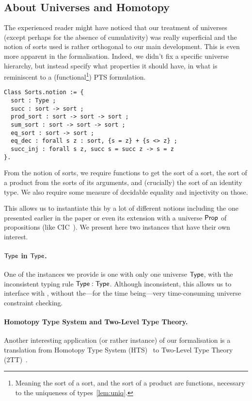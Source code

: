 \subsection{About Universes and Homotopy}
\label{sec:sorts}

The experienced reader might have noticed that our treatment of universes
(except perhaps for the absence of cumulativity) was really superficial and the
notion of sorts used is rather orthogonal to our main development.
This is even more apparent in the formalisation. Indeed, we didn't fix a
specific universe hierarchy, but instead specify what properties it should
have, in what is reminiscent to a (functional\footnote{Meaning the sort of a
sort, and the sort of a product are functions, necessary to the uniqueness of
types~\eqref{lem:uniq}.}) PTS formulation.
%
\begin{verbatim}
Class Sorts.notion := {
  sort : Type ;
  succ : sort -> sort ;
  prod_sort : sort -> sort -> sort ;
  sum_sort : sort -> sort -> sort ;
  eq_sort : sort -> sort ;
  eq_dec : forall s z : sort, {s = z} + {s <> z} ;
  succ_inj : forall s z, succ s = succ z -> s = z
}.
\end{verbatim}
%
From the notion of sorts, we require functions to get the sort of a sort,
the sort of a product from the sorts of its arguments, and (crucially) the sort
of an identity type.
We also require some measure of decidable equality and injectivity on those.

This allows us to instantiate this by a lot of different notions including the
one presented earlier in the paper or even its extension with a universe $\mathsf{Prop}$
of propositions (like CIC~\cite{bertot2004interactive}). We present here two
instances that have their own interest.

\paragraph{$\mathsf{Type}$ in $\mathsf{Type}$.}
One of the instances we provide is one with only one universe $\mathsf{Type}$, with the
inconsistent typing rule $\mathsf{Type} : \mathsf{Type}$.
Although inconsistent, this allows us to interface with \TemplateCoq, without
the---for the time being---very time-consuming universe constraint checking.

\paragraph{Homotopy Type System and Two-Level Type Theory.}
Another interesting application (or rather instance) of our formalisation
is a translation from Homotopy Type System (HTS)~\cite{hts-sota} to
Two-Level Type Theory
(2TT)~\cite{DBLP:journals/corr/AltenkirchCK16,DBLP:journals/corr/AnnenkovCK17}.

